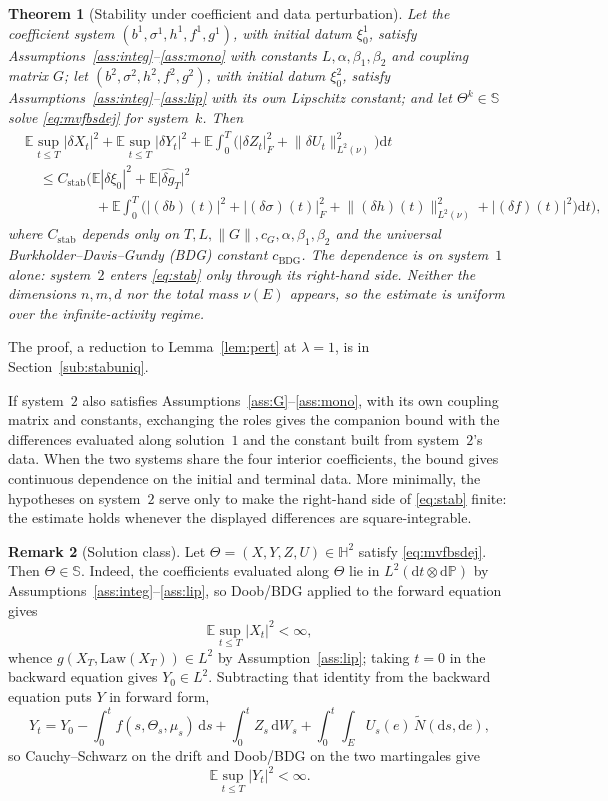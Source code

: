 \documentclass[preprint,12pt]{elsarticle}
\newcommand{\E}{\mathbb{E}}
\newcommand{\Prob}{\mathbb{P}}
\newcommand{\diff}{\mathrm{d}}
\newcommand{\Nt}{\widetilde{N}}
\newcommand{\Lnu}{L^2(\nu)}
\newcommand{\Law}{\mathrm{Law}}
\newcommand{\HH}{\mathbb{S}}
\newcommand{\Hweak}{\mathbb{H}^2}
\newcommand{\Lnorm}[1]{\lVert #1\rVert_{\Lnu}}
\numberwithin{equation}{section}
\theoremstyle{plain}
\newtheorem{theorem}{Theorem}[section]
\theoremstyle{definition}
\theoremstyle{\PaperRemarkStyle}
\newtheorem{remark}[theorem]{Remark}
\begin{document}
\begin{theorem}[Stability under coefficient and data perturbation]\label{thm:stab}
Let the coefficient system $(b^1,\sigma^1,h^1,f^1,g^1)$, with initial datum $\xi_0^1$,
satisfy Assumptions~\ref{ass:integ}--\ref{ass:mono} with constants $L,\alpha,\beta_1,\beta_2$
and coupling matrix $G$; let $(b^2,\sigma^2,h^2,f^2,g^2)$, with initial datum $\xi_0^2$,
satisfy Assumptions~\ref{ass:integ}--\ref{ass:lip} with its own Lipschitz constant; and let
$\Theta^k\in\HH$ solve \eqref{eq:mvfbsdej} for system~$k$. Then
\begin{equation}\label{eq:stab}
\begin{split}
&\E\sup_{t\le T}|\delta X_t|^2+\E\sup_{t\le T}|\delta Y_t|^2
+\E\!\int_0^T\!\big(|\delta Z_t|_F^2+\Lnorm{\delta U_t}^2\big)\diff t\\
&\quad\le C_{\mathrm{stab}}\Big(\E|\delta\xi_0|^2+\E\big|\widehat{\delta g}_T\big|^2\\
&\qquad\qquad\quad+\E\!\int_0^T\!\big(|(\delta b)(t)|^2+|(\delta\sigma)(t)|_F^2
+\Lnorm{(\delta h)(t)}^2+|(\delta f)(t)|^2\big)\diff t\Big),
\end{split}
\end{equation}
where $C_{\mathrm{stab}}$ depends only on $T,L,\|G\|,c_G,\alpha,\beta_1,\beta_2$ and the universal
Burkholder--Davis--Gundy (BDG) constant $c_{\mathrm{BDG}}$. The dependence is on
system~$1$ alone: system~$2$ enters \eqref{eq:stab} only through its right-hand side.
Neither the dimensions $n,m,d$ nor the total mass $\nu(E)$ appears, so the estimate is
uniform over the infinite-activity regime.
\end{theorem}
\noindent The proof, a reduction to Lemma~\ref{lem:pert} at $\lambda=1$, is in
Section~\ref{sub:stabuniq}.

\noindent If system~$2$ also satisfies Assumptions~\ref{ass:G}--\ref{ass:mono}, with its
own coupling matrix and constants, exchanging the roles gives the companion bound with the
differences evaluated along solution~$1$ and the constant built from system~$2$'s data.
When the two systems share the four interior coefficients, the bound gives continuous
dependence on the initial and terminal data. More minimally, the hypotheses on system~$2$
serve only to make the right-hand side of \eqref{eq:stab} finite: the estimate holds
whenever the displayed differences are square-integrable.

\begin{remark}[Solution class]\label{rem:cwp-class}
Let $\Theta=(X,Y,Z,U)\in\Hweak$ satisfy \eqref{eq:mvfbsdej}. Then $\Theta\in\HH$. Indeed, the coefficients evaluated along $\Theta$ lie in
$L^2(\diff t\otimes\diff\Prob)$ by Assumptions~\ref{ass:integ}--\ref{ass:lip}, so Doob/BDG
applied to the forward equation gives
\[
\E\sup_{t\le T}|X_t|^2<\infty ,
\]
whence $g(X_T,\Law(X_T))\in L^2$ by Assumption~\ref{ass:lip}; taking $t=0$ in the backward
equation gives $Y_0\in L^2$. Subtracting that identity from the backward
equation puts $Y$ in forward form,
\[
Y_t=Y_0-\int_0^t f(s,\Theta_s,\mu_s)\,\diff s+\int_0^t Z_s\,\diff W_s
+\int_0^t\!\!\int_E U_s(e)\,\Nt(\diff s,\diff e),
\]
so Cauchy--Schwarz on the drift and Doob/BDG on the two martingales give
\[
\E\sup_{t\le T}|Y_t|^2<\infty .
\]
\end{remark}
\end{document}
